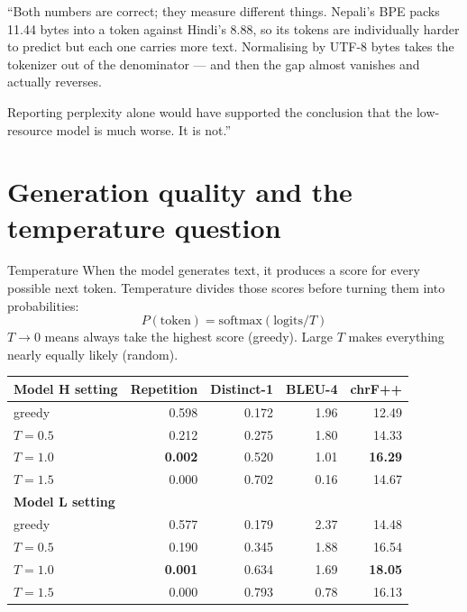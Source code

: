\documentclass[11pt]{report}
\begin{document}
\begin{saybox}
``Both numbers are correct; they measure different things. Nepali's BPE packs
11.44 bytes into a token against Hindi's 8.88, so its tokens are individually
harder to predict but each one carries more text. Normalising by UTF-8 bytes
takes the tokenizer out of the denominator --- and then the gap almost vanishes
and actually reverses.

Reporting perplexity alone would have supported the conclusion that the
low-resource model is much worse. It is not.''
\end{saybox}

\section{Generation quality and the temperature question}

\begin{concept}{Temperature}
When the model generates text, it produces a score for every possible next
token. Temperature divides those scores before turning them into probabilities:
\[
P(\text{token}) = \mathrm{softmax}(\text{logits} / T)
\]
$T \rightarrow 0$ means always take the highest score (greedy). Large $T$ makes
everything nearly equally likely (random).
\end{concept}

\begin{center}
\begin{tabular}{@{}lrrrr@{}}
\toprule
\textbf{Model H setting} & \textbf{Repetition} & \textbf{Distinct-1} & \textbf{BLEU-4} & \textbf{chrF++} \\
\midrule
greedy & 0.598 & 0.172 & 1.96 & 12.49 \\
$T = 0.5$ & 0.212 & 0.275 & 1.80 & 14.33 \\
$T = 1.0$ & \textbf{0.002} & 0.520 & 1.01 & \textbf{16.29} \\
$T = 1.5$ & 0.000 & 0.702 & 0.16 & 14.67 \\
\midrule
\textbf{Model L setting} & & & & \\
\midrule
greedy & 0.577 & 0.179 & 2.37 & 14.48 \\
$T = 0.5$ & 0.190 & 0.345 & 1.88 & 16.54 \\
$T = 1.0$ & \textbf{0.001} & 0.634 & 1.69 & \textbf{18.05} \\
$T = 1.5$ & 0.000 & 0.793 & 0.78 & 16.13 \\
\bottomrule
\end{tabular}
\end{center}
\end{document}
